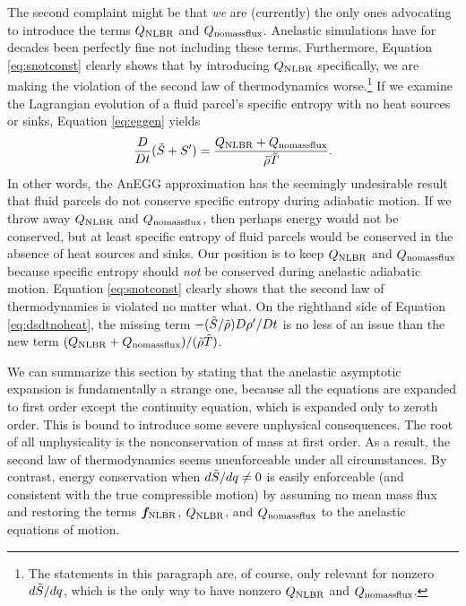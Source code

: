 \documentclass[12pt]{article}
\newcommand{\heatnlbr}{Q_{\rm NLBR}}
\newcommand{\forcenlbr}{\bm{f}_{\rm NLBR}}
\newcommand{\heatnomassflux}{Q_{\rm nomassflux}}
\begin{document}
The second complaint might be that \textit{we} are (currently) the only ones advocating to introduce the terms $\heatnlbr$ and $\heatnomassflux$. Anelastic simulations have for decades been perfectly fine not including these terms. Furthermore, Equation \eqref{eq:snotconst} clearly shows that by introducing $\heatnlbr$ specifically, we are making the violation of the second law of thermodynamics worse.\footnote{The statements in this paragraph are, of course, only relevant for nonzero $d\tilde{S}/dq$, which is the only way to have nonzero $\heatnlbr$ and $\heatnomassflux$.} If we examine the Lagrangian evolution of a fluid parcel's specific entropy with no heat sources or sinks, Equation \eqref{eq:eggen} yields 
\begin{align}\label{eq:dsdtnoheat}
	\frac{D}{Dt}(\entrtilde + \entrprime) = \frac{\heatnlbr+\heatnomassflux}{\rhotilde\tmptilde}.
\end{align}
In other words, the AnEGG approximation has the seemingly undesirable result that fluid parcels do not conserve specific entropy during adiabatic motion. If we throw away $\heatnlbr$ and $\heatnomassflux$, then perhaps energy would not be conserved, but at least specific entropy of fluid parcels would be conserved in the absence of heat sources and sinks. Our position is to keep $\heatnlbr$ and $\heatnomassflux$ because specific entropy should \textit{not} be conserved during anelastic adiabatic motion. Equation \eqref{eq:snotconst} clearly shows that the second law of thermodynamics is violated no matter what. On the righthand side of Equation \eqref{eq:dsdtnoheat}, the missing term $-(\tilde{S}/\tilde{\rho})D{\rho^\prime}/Dt$ is no less of an issue than the new term $(\heatnlbr+\heatnomassflux)/(\rhotilde\tmptilde)$. 

We can summarize this section by stating that the anelastic asymptotic expansion is fundamentally a strange one, because all the equations are expanded to first order except the continuity equation, which is expanded only to zeroth order. This is bound to introduce some severe unphysical consequences. The root of all unphysicality is the nonconservation of mass at first order. As a result, the second law of thermodynamics seems unenforceable under all circumstances. By contrast, energy conservation when $d\tilde{S}/dq\neq0$ is easily enforceable (and consistent with the true compressible motion) by assuming no mean mass flux and restoring the terms $\forcenlbr$, $\heatnlbr$, and $\heatnomassflux$ to the anelastic equations of motion. 
\end{document}
